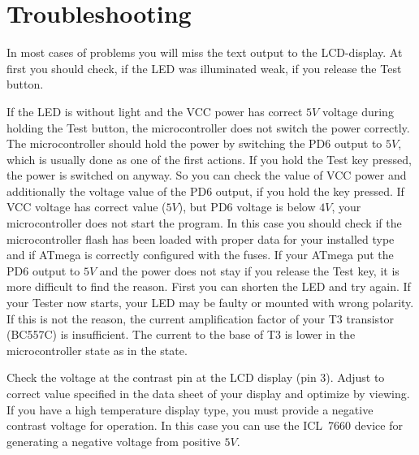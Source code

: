 \section{Troubleshooting}
In most cases of problems you will miss the text output to the LCD-display.
At first you should check, if the LED was illuminated weak, if you release
the Test button. 
\begin{description} \setlength{\itemsep}{0em}

\item[Power does not switch on.]
If the LED is without light and the VCC power has correct
\(5V\) voltage during holding the Test button, the microcontroller does not switch the power
correctly. The microcontroller should hold the power by switching the
PD6 output to \(5V\), which is usually done as one of the first actions.
If you hold the Test key pressed, the power is switched on anyway.
So you can check the value of VCC power and additionally the voltage value
of the PD6 output, if you hold the key pressed.
If VCC voltage has correct value (\(5V\)), but PD6 voltage is
below \(4V\), your microcontroller does not start the program. In this case
you should check if the microcontroller flash has been loaded with proper data for your
installed type and if ATmega is correctly configured with the fuses.
If your ATmega put the PD6 output to \(5V\) and the power does not stay if you
release the Test key, it is more difficult to find the reason.
First you can shorten the LED and try again. If your Tester now starts,
your LED may be faulty or mounted with wrong polarity. If this is not
the reason, the current amplification factor of your T3 transistor (BC557C)
is insufficient. The current to the base of T3 is lower in the microcontroller
state as in the  state.

\item[Nothing is readable on the LCD display]
Check the voltage at the contrast pin at the LCD display (pin 3). Adjust to
correct value specified in the data sheet of your display and optimize by viewing.
If you have a high temperature display type, you must provide a negative contrast voltage
for operation. In this case you can use the ICL~7660 device for generating
a negative voltage from positive \(5V\).


\end{description}
